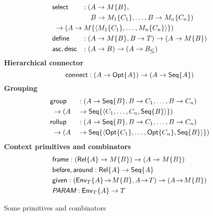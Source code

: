 \begin{table}
\begin{framed}
    \begin{alignat*}{2}
        & \Select & : (& A \to \Wrap{M}{B}, \\
        & && B \to \Wrap{M_1}{C_1}, \ldots, B \to \Wrap{M_n}{C_n}) \\
        & \;\to (A \to \Wrap{M}{\Tuple{\Wrap{M_1}{C_1}, \ldots, \Wrap{M_n}{C_n}}})\hidewidth && \\
        & \Define & : (& A \to \Wrap{M}{B}, B \to T) \to (A \to \Wrap{M}{B}) \\
        & \Asc, \Desc & : (& A \to B) \to (A \to B_\lessgtr)
    \end{alignat*}
    \textbf{Hierarchical connector}
    \begin{equation*}
        \mathsf{connect} : (A \to \mathsf{Opt}{\left\{A\right\}}) \to (A \to \mathsf{Seq}{\left\{A\right\}})
    \end{equation*}
    \textbf{Grouping}
    \begin{alignat*}{2}
        & \mathsf{group} && : ( A \to \mathsf{Seq}{\left\{B\right\}}, B \to C_1, \ldots, B \to C_n) \\
        & \;\to (A && \to \mathsf{Seq}{\left\{\langle C_1, \ldots, C_n, \mathsf{Seq}{\left\{B\right\}} \rangle\right\}}) \\
        & \mathsf{rollup} && : ( A \to \mathsf{Seq}{\left\{B\right\}}, B \to C_1, \ldots, B \to C_n) \\
        & \;\to (A && \to \mathsf{Seq}{\left\{\langle \mathsf{Opt}{\left\{C_1\right\}}, \ldots, \mathsf{Opt}{\left\{C_n\right\}}, \mathsf{Seq}{\left\{B\right\}} \rangle\right\}})
    \end{alignat*}
    \textbf{Context primitives and combinators}
    \begin{align*}
        & \mathsf{frame} : (\mathsf{Rel}{\left\{A\right\}} \to M{\left\{B\right\}}) \to (A \to M{\left\{B\right\}}) \\
        & \mathsf{before}, \mathsf{around} : \mathsf{Rel}{\left\{A\right\}} \to \mathsf{Seq}{\left\{A\right\}} \\
        & \mathsf{given} : (\mathsf{Env}_{T}{\left\{A\right\}} \!\to\! M{\left\{B\right\}}, A \!\to\! T) \to (A \!\to\! M{\left\{B\right\}}) \\
        & \textit{\textsf{PARAM}} : \mathsf{Env}_{T}{\left\{A\right\}} \to T
    \end{align*}
    \vspace*{-\bigskipamount}
    \end{framed}
    \caption{Some primitives and combinators}
    \label{tab:common-combinators}
\end{table}

